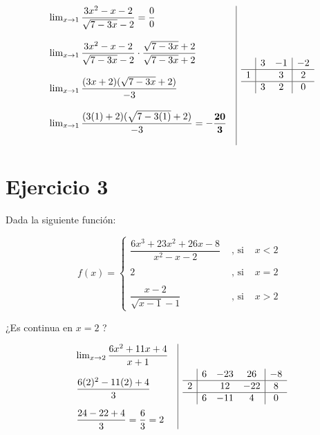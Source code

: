 \documentclass[12pt]{article}
\begin{document}
\[
\begin{array}{l|c}
  \begin{array}{l}
    \lim_{x \to 1} \dfrac{3x^2 - x - 2}{\sqrt{7-3x} - 2} = \dfrac{0}{0} \\\\
    \lim_{x \to 1} \dfrac{3x^2 - x - 2}{\sqrt{7-3x} - 2} \cdot \dfrac{\sqrt{7-3x} + 2}{\sqrt{7-3x} + 2} \\\\
    \lim_{x \to 1} \dfrac{(3x + 2)(\sqrt{7-3x} + 2)}{-3} \\\\
    \lim_{x \to 1} \dfrac{(3(1) + 2)(\sqrt{7-3(1)} + 2)}{-3} = \mathbf{-\dfrac{20}{3}} \\\\
  \end{array}
  &
  \begin{array}{c|c c|c}
    & 3 & -1 & -2 \\
    \hline
    1 &  & 3 & 2 \\
    \hline
    & 3 & 2 & 0 \\
  \end{array}
\end{array}
\]





\newpage
\section*{Ejercicio 3}
\noindent Dada la siguiente función:

\[
f(x) = 
\left\{
  \begin{array}{cll}
    \dfrac{6x^3 + 23x^2 + 26x - 8}{x^2 - x -2} & \text{ , si } & x < 2 \\\\
    2 & \text{ , si } & x = 2 \\\\
    \dfrac{x-2}{\sqrt{x-1} - 1} & \text{ , si } & x > 2
  \end{array}
\right.
\]

\noindent ¿Es continua en $x=2$ ?

\[
\begin{array}{l|c}
  \begin{array}{l}
    \lim_{x \to 2} \dfrac{6x^2 + 11x + 4}{x + 1} \\\\
    \dfrac{6(2)^2 - 11(2) + 4}{3} \\\\
    \dfrac{24 - 22 + 4}{3} = \dfrac{6}{3} = 2
  \end{array}
  &
  \begin{array}{c|c c c|c}
    & 6 & -23 & 26 & -8 \\
    \hline
    2 &  & 12 & -22 & 8 \\
    \hline
    & 6 & -11 & 4 & 0 \\
  \end{array}
\end{array}
\]
\end{document}
